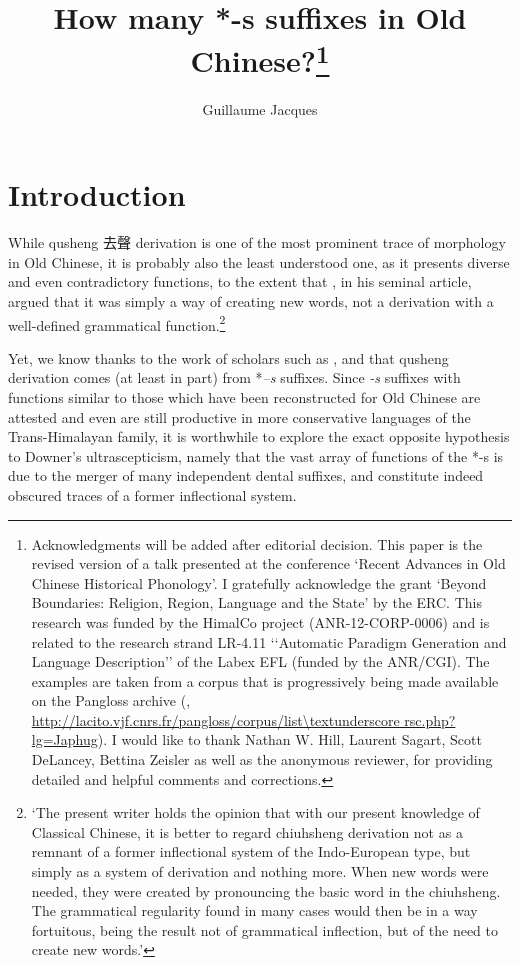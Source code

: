 \documentclass[oneside,a4paper,11pt]{article}
\newcommand{\ipa}[1]{{\phon\textit{\mbox{#1}}}}
\newcommand{\zh}[1]{{\cn#1}}
\begin{document}
 
\title{How many *-s suffixes in Old Chinese?\footnote{Acknowledgments will be added after editorial decision. This paper is the revised version of a talk presented at the conference `Recent Advances in Old Chinese Historical Phonology'. I gratefully acknowledge the grant `Beyond Boundaries: Religion, Region, Language and the State' by the ERC. This research was funded by the HimalCo project (ANR-12-CORP-0006) and is related to the research strand LR-4.11 ‘‘Automatic Paradigm Generation and Language Description’’ of the Labex EFL (funded by the ANR/CGI).  The examples are taken from a corpus that is progressively being made available on the Pangloss archive (\citealt{michailovsky14pangloss}, 
 \url{http://lacito.vjf.cnrs.fr/pangloss/corpus/list\textunderscore rsc.php?lg=Japhug}).  
 I would like to thank Nathan W. Hill, Laurent Sagart, Scott DeLancey, Bettina Zeisler as well as the anonymous reviewer, for providing detailed and helpful comments and corrections.} }  
\author{Guillaume Jacques}
\maketitle
 
\section{Introduction}
While qusheng \zh{去聲} derivation is one of the most prominent trace of morphology in Old Chinese, it is probably also the least understood one, as it presents diverse and even contradictory functions, to the extent that \citet[262]{downer59}, in his seminal article, argued that it was simply a way of creating new words, not a derivation with a well-defined grammatical function.\footnote{`The present writer holds the opinion that with our present knowledge of Classical Chinese, it is better to regard chiuhsheng derivation not as a remnant of a former inflectional system of the Indo-European type, but simply as a system of derivation and nothing more. When new words were needed, they were created by pronouncing the basic word in the chiuhsheng. The grammatical regularity found in many cases would then be in a way fortuitous, being the result not of grammatical inflection, but of the need to create new words.'}
 
Yet, we know thanks to the work of scholars such as \citet{haudricourt54chinois}, \citet{forrest60occlusives, schuessler85qusheng} and \citet{sagart99roc} that qusheng derivation comes (at least in part) from *\ipa{--s} suffixes. Since \ipa{-s} suffixes with functions similar to those which have been reconstructed for Old Chinese are attested and even are still productive in more conservative languages of the Trans-Himalayan family, it is worthwhile to explore the exact opposite hypothesis to Downer's ultrascepticism, namely that the vast array of functions of the *-s is due to the merger of many independent dental suffixes, and constitute indeed obscured traces of a former inflectional system.
\end{document}
